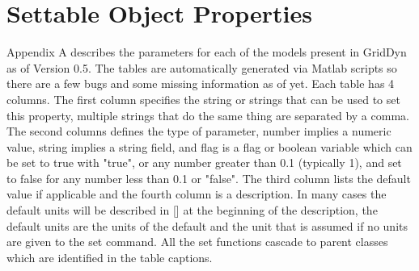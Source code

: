 \documentclass[12pt]{article} %
\begin{document}



\newpage
\appendix
\setcounter{table}{0}
\renewcommand{\thetable}{A\arabic{table}}
\section{Settable Object Properties} \label{App:AppendixA}

Appendix A describes the parameters for each of the models present in GridDyn as of Version 0.5.  The tables are automatically generated via Matlab scripts so there are a few bugs and some missing information as of yet.  Each table has 4 columns. The first column specifies the string or strings that can be used to set this property,  multiple strings that do the same thing are separated by a comma.  The second columns defines the type of parameter,  number implies a numeric value, string implies a string field, and flag is a flag or boolean variable which can be set to true with "true", or any number greater than 0.1 (typically 1), and set to false for any number less than 0.1 or "false".  The third column lists the default value if applicable and the fourth column is a description.  In many cases the default units will be described in [] at the beginning of the description,  the default units are the units of the default and the unit that is assumed if no units are given to the set command.  All the set functions cascade to parent classes which are identified in the table captions.

\end{document}
